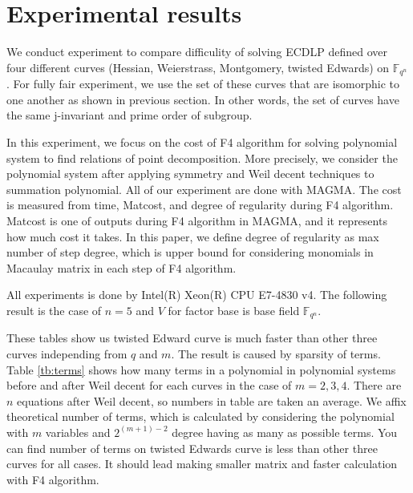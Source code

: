 \section{Experimental results}
\label{sec:experiment}

We conduct experiment to compare difficulity of solving ECDLP 
defined over four different curves 
(Hessian, Weierstrass, Montgomery, twisted Edwards) on $\mathbb{F}_{q^n}$.
%
For fully fair experiment, we use the set of these curves 
that are isomorphic to one another as shown in previous section.
%
In other words, the set of curves have the same j-invariant 
and prime order of subgroup.

In this experiment, we focus on the cost of F4 algorithm for solving polynomial 
system to find relations of point decomposition.
%
More precisely, we consider the polynomial system 
after applying symmetry and Weil decent techniques to summation polynomial.
%
All of our experiment are done with MAGMA. 
The cost is measured from time, Matcost, and degree of regularity 
during F4 algorithm.
%
Matcost is one of outputs during F4 algorithm in MAGMA, 
and it represents how much cost it takes.
%
In this paper, we define degree of regularity as max number of step degree, 
which is upper bound for considering monomials in Macaulay matrix 
in each step of F4 algorithm.

All experiments is done by Intel(R) Xeon(R) CPU E7-4830 v4.
%
The following result is the case of $n=5$ and 
$V$ for factor base is base field $\mathbb{F}_{q^n}$.



These tables show us twisted Edward curve is much faster than 
other three curves independing from $q$ and $m$.
%
The result is caused by sparsity of terms.
Table \ref{tb:terms} shows how many terms in a polynomial in polynomial systems 
before and after Weil decent for each curves in the case of $m=2,3,4$.
%
There are $n$ equations after Weil decent, 
so numbers in table are taken an average. 
%
We affix theoretical number of terms, which is calculated by considering
the polynomial with $m$ variables and $2^{(m+1)-2}$ degree 
having as many as possible terms. 
%
You can find number of terms on twisted Edwards curve is less than 
other three curves for all cases.
%
It should lead making smaller matrix and faster calculation with F4 algorithm.



